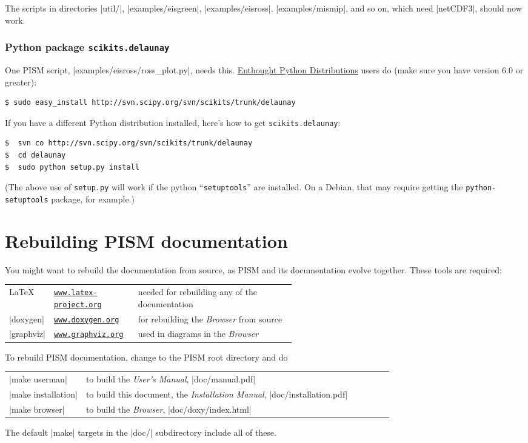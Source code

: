 \documentclass[11pt,final]{amsart}
\renewcommand{\t}[1]{\texttt{#1}}
\begin{document}
The scripts in directories |util/|, |examples/eisgreen|, |examples/eisross|, |examples/mismip|, and so on, which need |netCDF3|, should now work.


\subsubsection*{Python package \texttt{scikits.delaunay}}  One PISM script, |examples/eisross/ross_plot.py|, needs this. \href{http://www.enthought.com/}{Enthought Python Distributions} users do (make sure you have version 6.0 or greater): 
\begin{verbatim}
$ sudo easy_install http://svn.scipy.org/svn/scikits/trunk/delaunay
\end{verbatim}
If you have a different Python distribution installed, here's how to get \texttt{scikits.delaunay}:
\begin{verbatim}
$  svn co http://svn.scipy.org/svn/scikits/trunk/delaunay
$  cd delaunay
$  sudo python setup.py install
\end{verbatim}
(The above use of \verb|setup.py| will work if the python ``\verb|setuptools|'' are installed.  On a Debian, that may require getting the \verb|python-setuptools| package, for example.)

\newpage
\section{Rebuilding PISM documentation}
\label{sec:docs}

You might want to rebuild the documentation from source, as PISM and its documentation evolve together.  These tools are required:
\bigskip
\begin{center}
  \begin{tabular*}{0.9\linewidth}{llp{0.55\linewidth}}
    \hline
    \LaTeX & \href{http://www.latex-project.org/}{\t{www.latex-project.org}} &  needed for rebuilding any of the documentation \\
    |doxygen|\index{doxygen} & \href{http://www.stack.nl/~dimitri/doxygen/}{\t{www.doxygen.org}} &  for rebuilding the \emph{Browser} from source  \\
    |graphviz|\index{graphviz} & \href{http://www.graphviz.org/}{\t{www.graphviz.org}} &  used in diagrams in the \emph{Browser}  \\
    \hline
  \end{tabular*}
\end{center}
\bigskip
\noindent To rebuild PISM documentation, change to the PISM root directory and do
\begin{center}
  \begin{tabular*}{0.9\linewidth}{lp{0.8\linewidth}}
    |make userman| & to build the \emph{User's Manual}, |doc/manual.pdf|\\
    |make installation| & to build this document, the \emph{Installation Manual}, |doc/installation.pdf|\\
    |make browser| & to build the \emph{Browser}, |doc/doxy/index.html|\\
  \end{tabular*}
\end{center}
The default |make| targets in the |doc/| subdirectory include all of these.
\end{document}
